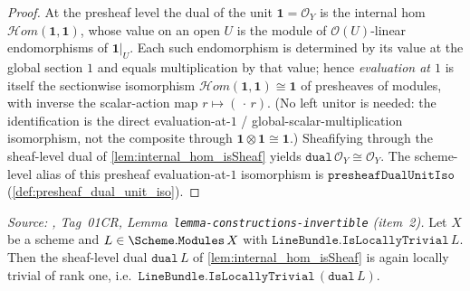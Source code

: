 \begin{proof}
  \leanok
  At the presheaf level the dual of the unit \(\mathbf{1} = \mathcal{O}_Y\) is the internal
  hom \(\mathcal{H}om(\mathbf{1}, \mathbf{1})\), whose value on an open \(U\) is the module
  of \(\mathcal{O}(U)\)-linear endomorphisms of \(\mathbf{1}|_U\). Each such endomorphism is
  determined by its value at the global section \(1\) and equals multiplication by that
  value; hence \emph{evaluation at \(1\)} is itself the sectionwise isomorphism
  \(\mathcal{H}om(\mathbf{1}, \mathbf{1}) \cong \mathbf{1}\) of presheaves of modules, with
  inverse the scalar-action map \(r \mapsto (\,\cdot\,r)\). (No left unitor is needed: the
  identification is the direct evaluation-at-\(1\) / global-scalar-multiplication
  isomorphism, not the composite through \(\mathbf{1} \otimes \mathbf{1} \cong \mathbf{1}\).)
  Sheafifying through the sheaf-level dual of \cref{lem:internal_hom_isSheaf} yields
  \(\mathtt{dual}\,\mathcal{O}_Y \cong \mathcal{O}_Y\). The scheme-level alias of this
  presheaf evaluation-at-\(1\) isomorphism is
  \(\mathtt{presheafDualUnitIso}\) (\cref{def:presheaf_dual_unit_iso}).
\end{proof}

\begin{lemma}\leanok
  \label{lem:dual_isLocallyTrivial}
  \textit{Source: \cite{stacks-project}, Tag~01CR,
  Lemma~\texttt{lemma-constructions-invertible} (item~2).}
  Let \(X\) be a scheme and \(L \in \Scheme.\mathtt{Modules}\,X\) with
  \(\mathtt{LineBundle.IsLocallyTrivial}\,L\). Then the sheaf-level dual
  \(\mathtt{dual}\,L\) of \cref{lem:internal_hom_isSheaf} is again locally trivial of
  rank one, i.e.\ \(\mathtt{LineBundle.IsLocallyTrivial}\,(\mathtt{dual}\,L)\).
\end{lemma}

